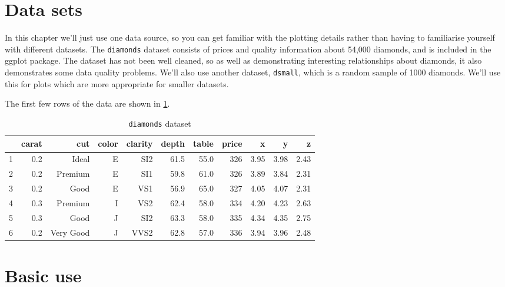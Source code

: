 \section{Data sets}\label{sec:data_sets}

In this chapter we'll just use one data source, so you can get familiar with the plotting details rather than having to familiarise yourself with different datasets.  The {\tt diamonds} dataset consists of prices and quality information about 54,000 diamonds, and is included in the ggplot package.  The dataset has not been well cleaned, so as well as demonstrating interesting relationships about diamonds, it also demonstrates some data quality problems.  We'll also use another dataset, {\tt dsmall}, which is a random sample of 1000 diamonds.  We'll use this for plots which are more appropriate for smaller datasets.

The first few rows of the data are shown in \ref{tab:diamonds}.

\begin{table}[ht]
\begin{center}
\begin{tabular}{l|rrrrrrrrrr}
  \hline
 & carat & cut & color & clarity & depth & table & price & x & y & z \\
  \hline
1 & 0.2 & Ideal & E & SI2 & 61.5 & 55.0 & 326 & 3.95 & 3.98 & 2.43 \\
  2 & 0.2 & Premium & E & SI1 & 59.8 & 61.0 & 326 & 3.89 & 3.84 & 2.31 \\
  3 & 0.2 & Good & E & VS1 & 56.9 & 65.0 & 327 & 4.05 & 4.07 & 2.31 \\
  4 & 0.3 & Premium & I & VS2 & 62.4 & 58.0 & 334 & 4.20 & 4.23 & 2.63 \\
  5 & 0.3 & Good & J & SI2 & 63.3 & 58.0 & 335 & 4.34 & 4.35 & 2.75 \\
  6 & 0.2 & Very Good & J & VVS2 & 62.8 & 57.0 & 336 & 3.94 & 3.96 & 2.48 \\
   \hline
\end{tabular}
\caption{{\tt diamonds} dataset}
\label{tab:diamonds}
\end{center}
\end{table}

\section{Basic use}\label{sec:basic_use}

